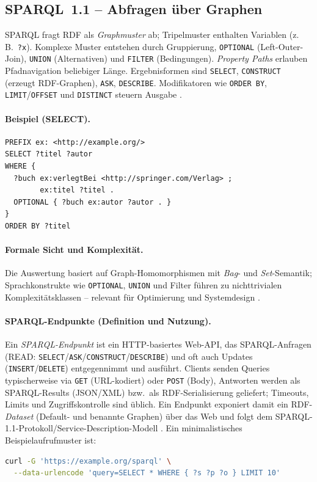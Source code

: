 \subsection{SPARQL~1.1 -- Abfragen über Graphen}
\label{subsec:sparql}

SPARQL fragt RDF als \emph{Graphmuster} ab; Tripelmuster enthalten Variablen (z.\,B.\ \texttt{?x}). Komplexe Muster entstehen durch Gruppierung, \texttt{OPTIONAL} (Left-Outer-Join), \texttt{UNION} (Alternativen) und \texttt{FILTER} (Bedingungen). \emph{Property Paths} erlauben Pfadnavigation beliebiger Länge. Ergebnisformen sind \texttt{SELECT}, \texttt{CONSTRUCT} (erzeugt RDF-Graphen), \texttt{ASK}, \texttt{DESCRIBE}. Modifikatoren wie \texttt{ORDER BY}, \texttt{LIMIT}/\texttt{OFFSET} und \texttt{DISTINCT} steuern Ausgabe \cite{SPARQL11Overview,Hitzler,AntoniouVanHarmelen}.

\paragraph{Beispiel (SELECT).}
\begin{lstlisting}
PREFIX ex: <http://example.org/>
SELECT ?titel ?autor
WHERE {
  ?buch ex:verlegtBei <http://springer.com/Verlag> ;
        ex:titel ?titel .
  OPTIONAL { ?buch ex:autor ?autor . }
}
ORDER BY ?titel
\end{lstlisting}

\paragraph{Formale Sicht und Komplexität.}
Die Auswertung basiert auf Graph-Homomorphismen mit \emph{Bag}- und \emph{Set}-Semantik; Sprachkonstrukte wie \texttt{OPTIONAL}, \texttt{UNION} und Filter führen zu nichttrivialen Komplexitätsklassen -- relevant für Optimierung und Systemdesign \cite{perezGutierrezSparql}.

\paragraph{SPARQL-Endpunkte (Definition und Nutzung).}
Ein \emph{SPARQL-Endpunkt} ist ein HTTP-basiertes Web-API, das SPARQL-Anfragen (READ: \texttt{SELECT}/\texttt{ASK}/\texttt{CONSTRUCT}/\texttt{DESCRIBE}) und oft auch Updates (\texttt{INSERT}/\texttt{DELETE}) entgegennimmt und ausführt. Clients senden Queries typischerweise via \texttt{GET} (URL-kodiert) oder \texttt{POST} (Body), Antworten werden als SPARQL-Results (JSON/XML) bzw.\ als RDF-Serialisierung geliefert; Timeouts, Limits und Zugriffskontrolle sind üblich. Ein Endpunkt exponiert damit ein RDF-\emph{Dataset} (Default- und benannte Graphen) über das Web und folgt dem SPARQL-1.1-Protokoll/Service-Description-Modell \cite{SPARQL11Overview}. Ein minimalistisches Beispielaufrufmuster ist:
\begin{lstlisting}[language=bash]
curl -G 'https://example.org/sparql' \
  --data-urlencode 'query=SELECT * WHERE { ?s ?p ?o } LIMIT 10'
\end{lstlisting}

